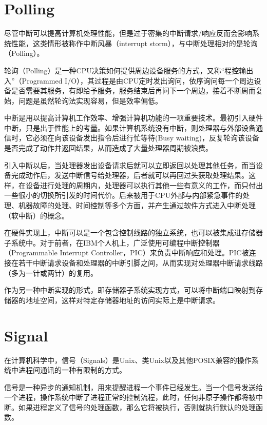 \section{Polling}


尽管中断可以提高计算机处理性能，但是过于密集的中断请求/响应反而会影响系统性能，这类情形被称作中断风暴（interrupt storm），与中断处理相对的是轮询（Polling）。




轮询（Polling）是一种CPU决策如何提供周边设备服务的方式，又称“程控输出入”（Programmed I/O），其过程是由CPU定时发出询问，依序询问每一个周边设备是否需要其服务，有即给予服务，服务结束后再问下一个周边，接着不断周而复始，问题是虽然轮询法实现容易，但是效率偏低。

中断是用以提高计算机工作效率、增强计算机功能的一项重要技术。最初引入硬件中断，只是出于性能上的考量。如果计算机系统没有中断，则处理器与外部设备通信时，它必须在向该设备发出指令后进行忙等待(Busy waiting)，反复轮询该设备是否完成了动作并返回结果，从而造成了大量处理器周期被浪费。

引入中断以后，当处理器发出设备请求后就可以立即返回以处理其他任务，而当设备完成动作后，发送中断信号给处理器，后者就可以再回过头获取处理结果。这样，在设备进行处理的周期内，处理器可以执行其他一些有意义的工作，而只付出一些很小的切换所引发的时间代价。后来被用于CPU外部与内部紧急事件的处理、机器故障的处理、时间控制等多个方面，并产生通过软件方式进入中断处理（软中断）的概念。

在硬件实现上，中断可以是一个包含控制线路的独立系统，也可以被集成进存储器子系统中。对于前者，在IBM个人机上，广泛使用可编程中断控制器（Programmable Interrupt Controller，PIC）来负责中断响应和处理。PIC被连接在若干中断请求设备和处理器的中断引脚之间，从而实现对处理器中断请求线路（多为一针或两针）的复用。

作为另一种中断实现的形式，即存储器子系统实现方式，可以将中断端口映射到存储器的地址空间，这样对特定存储器地址的访问实际上是中断请求。





\section{Signal}

在计算机科学中，信号（Signals）是Unix、类Unix以及其他POSIX兼容的操作系统中进程间通讯的一种有限制的方式。

信号是一种异步的通知机制，用来提醒进程一个事件已经发生。当一个信号发送给一个进程，操作系统中断了进程正常的控制流程，此时，任何非原子操作都将被中断。如果进程定义了信号的处理函数，那么它将被执行，否则就执行默认的处理函数。

